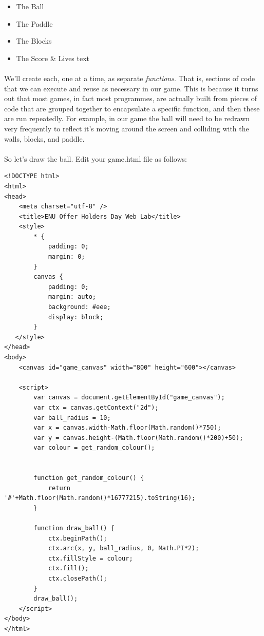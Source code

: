\documentclass[10pt, a4paper, oneside]{article}
\begin{document}
\begin{itemize}
\item The Ball
\item The Paddle
\item The Blocks
\item The Score \& Lives text
\end{itemize}

\paragraph{} We'll create each, one at a time, as separate \emph{functions}. That is, sections of code that we can execute and reuse as necessary in our game. This is because it turns out that most games, in fact most programmes, are actually built from pieces of code that are grouped together to encapsulate a specific function, and then these are run repeatedly. For example, in our game the ball will need to be redrawn very frequently to reflect it's moving around the screen and colliding with the walls, blocks, and paddle.

\paragraph{} So let's draw the ball. Edit your game.html file as follows:

\begin{lstlisting}
<!DOCTYPE html>
<html>
<head>
    <meta charset="utf-8" />
    <title>ENU Offer Holders Day Web Lab</title>
    <style>
        * { 
            padding: 0; 
            margin: 0; 
        } 
        canvas { 
            padding: 0; 
            margin: auto; 
            background: #eee; 
            display: block; 
        }
   </style>
</head>
<body>
    <canvas id="game_canvas" width="800" height="600"></canvas>

    <script>
        var canvas = document.getElementById("game_canvas");
        var ctx = canvas.getContext("2d");
        var ball_radius = 10;
        var x = canvas.width-Math.floor(Math.random()*750);
        var y = canvas.height-(Math.floor(Math.random()*200)+50);
        var colour = get_random_colour();


        function get_random_colour() {
            return '#'+Math.floor(Math.random()*16777215).toString(16);
        }

        function draw_ball() {
            ctx.beginPath();
            ctx.arc(x, y, ball_radius, 0, Math.PI*2);
            ctx.fillStyle = colour;
            ctx.fill();
            ctx.closePath();
        }
        draw_ball();
    </script>
</body>
</html>

\end{lstlisting}
\end{document}
